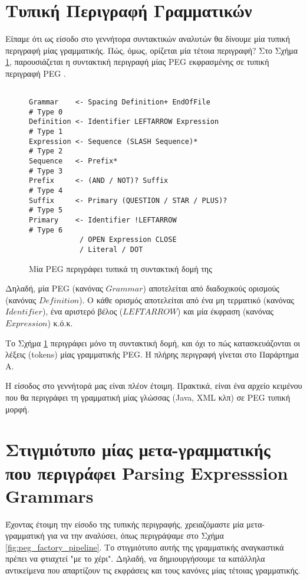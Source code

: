 \section{Τυπική Περιγραφή Γραμματικών}
Είπαμε ότι ως είσοδο στο γεννήτορα συντακτικών αναλυτών θα δίνουμε μία τυπική περιγραφή μίας γραμματικής. 
Πώς, όμως, ορίζεται μία τέτοια περιγραφή? Στο Σχήμα \ref{fig:peg_specification}, παρουσιάζεται η συντακτική περιγραφή μίας PEG εκφρασμένης σε τυπική περιγραφή PEG \cite{lgi}.

\begin{figure}[h]
\begin{Verbatim}

Grammar    <- Spacing Definition+ EndOfFile                     # Type 0
Definition <- Identifier LEFTARROW Expression                   # Type 1
Expression <- Sequence (SLASH Sequence)*                        # Type 2
Sequence   <- Prefix*                                           # Type 3
Prefix     <- (AND / NOT)? Suffix                               # Type 4
Suffix     <- Primary (QUESTION / STAR / PLUS)?                 # Type 5
Primary    <- Identifier !LEFTARROW                             # Type 6
            / OPEN Expression CLOSE
            / Literal / DOT
\end{Verbatim}
\caption{Μία PEG περιγράφει τυπικά τη συντακτική δομή της}
\label{fig:peg_specification}
\end{figure}

Δηλαδή, μία PEG (κανόνας $Grammar$) αποτελείται από διαδοχικούς ορισμούς (κανόνας $Definition$). 
Ο κάθε ορισμός αποτελείται από ένα μη τερματικό (κανόνας $Identifier$), ένα αριστερό βέλος ($LEFTARROW$) και μία έκφραση (κανόνας $Expression$) κ.ό.κ.

Το Σχήμα \ref{fig:peg_specification} περιγράφει μόνο τη συντακτική δομή, και όχι το πώς κατασκευάζονται οι λέξεις (tokens) μίας γραμματικής PEG.
H πλήρης περιγραφή γίνεται στο Παράρτημα Α.

Η είσοδος στο γεννήτορά μας είναι πλέον έτοιμη. 
Πρακτικά, είναι ένα αρχείο κειμένου που θα περιγράφει τη γραμματική μίας γλώσσας (Java, XML κλπ) σε PEG τυπική μορφή.

\section{Στιγμιότυπο μίας μετα-γραμματικής που περιγράφει Parsing Expresssion Grammars}

Έχοντας έτοιμη την είσοδο της τυπικής περιγραφής, χρειαζόμαστε μία μετα-γραμματική για να την αναλύσει, όπως περιγράψαμε στο Σχήμα \ref{fig:peg_factory_pipeline}. 
Το στιγμιότυπο αυτής της γραμματικής αναγκαστικά πρέπει να φτιαχτεί "με το χέρι".
Δηλαδή, να δημιουργήσουμε τα κατάλληλα αντικείμενα που απαρτίζουν τις εκφράσεις και τους κανόνες μίας τέτοιας γραμματικής.

